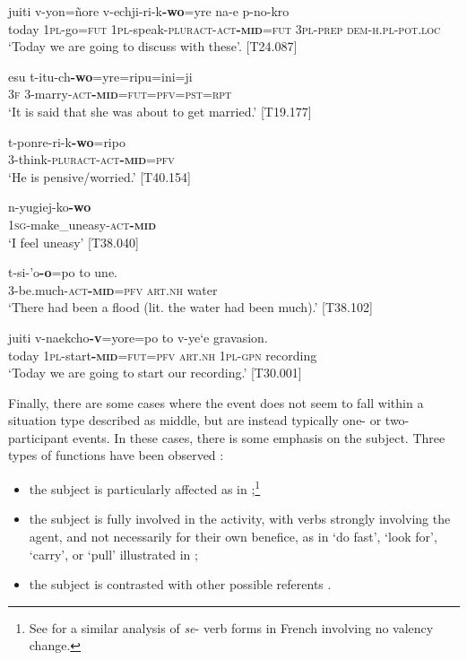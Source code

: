 \documentclass[output=paper]{langscibook}
\begin{document}
\ea
\label{ex:Rose:34}
\gll juiti v-yon=ñore v-echji-ri-k\textbf{-wo}=yre na-e p-no-kro\\
today 1\textsc{pl}-go=\textsc{fut} 1\textsc{pl}-speak-\textsc{pluract-act\textbf{-mid}}=\textsc{fut} \textsc{3pl-prep} \textsc{dem-h.pl}-\textsc{pot.loc}\\
\glt ‘Today we are going to discuss with these’. [T24.087]
\z

\ea
\label{ex:Rose:35}
\gll esu t-itu-ch\textbf{-wo}=yre=ripu=ini=ji\\
3\textsc{f} 3-marry-\textsc{act\textbf{-mid}=fut=pfv=pst=rpt}\\
\glt ‘It is said that she was about to get married.’ [T19.177]
\z

\ea
\label{ex:Rose:36}
\gll t-ponre-ri-k\textbf{-wo}=ripo \\
3-think-\textsc{pluract-act\textbf{-mid}=pfv}\\
\glt ‘He is pensive/worried.’ [T40.154]
\z

\ea
\label{ex:Rose:37}
\gll n-yugiej-ko\textbf{-wo}\\
1\textsc{sg}-make\_uneasy-\textsc{act\textbf{-mid}}\\
\glt ‘I feel uneasy’ [T38.040]
\z

\ea
\label{ex:Rose:38}
\gll t-si-'o\textbf{-o}=po to une. \\
3-be.much-\textsc{act\textbf{-mid}=pfv} \textsc{art.nh} water \textsc{}\\
\glt ‘There had been a flood (lit. the water had been much).’ [T38.102]
\z

\ea
\label{ex:Rose:39}
\gll juiti v-naekcho\textbf{-v}=yore=po to v-ye`e gravasion. \\
today 1\textsc{pl}-start\textbf{-}\textsc{\textbf{mid}=fut=pfv} \textsc{art.nh} \textsc{1pl}-\textsc{gpn} recording\\
\glt ‘Today we are going to start our recording.’ [T30.001]
\z


Finally, there are some cases where the event does not seem to fall within a situation type described as middle, but are instead typically one- or two-participant events. In these cases, there is some emphasis on the subject. Three types of functions have been observed :


\begin{itemize}
\item the subject is particularly affected as in ;\footnote{See \citet{Creissels2007} for a similar analysis of \textit{se}- verb forms in French involving no valency change.}
\item the subject is fully involved in the activity, with verbs strongly involving the agent, and not necessarily for their own benefice, as in ‘do fast’, ‘look for’, ‘carry’, or ‘pull’ illustrated in ;
\item the subject is contrasted with other possible referents .
\end{itemize}
\end{document}
